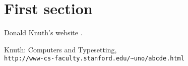 \documentclass[11pt]{article}
\begin{document}
\setlength{\baselineskip}{0.3in} 


\section{First section}

Donald Knuth's website \cite{knuthwebsite}. 

\medskip



\begin{thebibliography}{9}

Knuth: Computers and Typesetting,
\\\texttt{http://www-cs-faculty.stanford.edu/\~{}uno/abcde.html}
\end{thebibliography}
\end{document}
